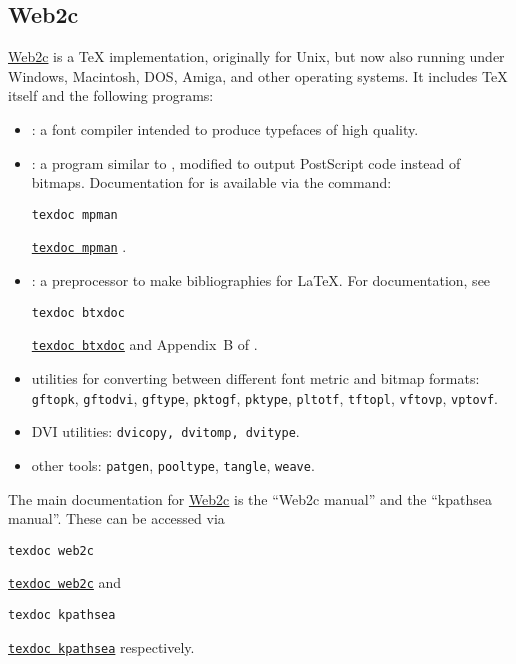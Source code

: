 \documentclass[11pt,a4paper]{article}
\newif\ifpdfoutput
\newcommand{\psext}{ps}
\newcommand{\pdfext}{pdf}
\newcommand{\dviext}{dvi}
\let\docext=\pdfext
\let\docext=\dviext
\newcommand{\dlink}[3]{%
  \ifpdfoutput
    \ifx\pdfext#3
      \href{#1/#2.#3}{\texttt{texdoc #2}}%
    \else
      \texttt{texdoc #2}%
    \fi
  \else
     \href{#1/#2.#3}{\mbox{\texttt{texdoc #2}}}%
  \fi}
\begin{document}
\subsection{Web2c}
\href{ftp://ftp.cs.umb.edu/tex}{Web2c} is a \TeX{} implementation,
originally for Unix, but now also running under Windows, Macintosh,
DOS, Amiga, and other operating systems. It includes \TeX{} itself and
the following programs:
  \begin{itemize}
  \item \MF: a font compiler intended to produce typefaces of high
    quality.~\cite{Knuth:1984:M}
  \item \MP: a program similar to \MF, modified to output PostScript
    code instead of bitmaps. Documentation for \MP{} is available
    via the command: \dlink{../metapost/base}{mpman}{\psext}.
  \item \BibTeX: a preprocessor to make bibliographies for
    \LaTeX. For documentation, see \dlink{../bibtex/base}{btxdoc}{\dviext} and
    Appendix~B of \cite{Lamport:1994:LDP}.
  \item utilities for converting between different font metric and
    bitmap formats: \texttt{gftopk}, \texttt{gftodvi},
    \texttt{gftype}, \texttt{pktogf}, \texttt{pktype},
    \texttt{pltotf}, \texttt{tftopl}, \texttt{vftovp}, \texttt{vptovf}.
  \item DVI utilities: \texttt{dvicopy, dvitomp, dvitype}.
  \item other tools: \texttt{patgen}, \texttt{pooltype},
    \texttt{tangle}, \texttt{weave}.
  \end{itemize}
  
  The main documentation for \href{ftp://ftp.cs.umb.edu/tex}{Web2c} is
  the ``Web2c manual'' and the ``kpathsea manual''. These can be
  accessed via \dlink{../programs}{web2c}{\docext} and
  \dlink{../programs}{kpathsea}{\docext} respectively.
\end{document}
